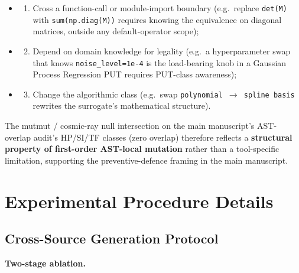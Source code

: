 \documentclass[manuscript,screen,review]{acmart}
\begin{document}
\begin{itemize}

\item
  \begin{enumerate}
  
  \item
    Cross a function-call or module-import boundary (e.g.~replace
    \texttt{det(M)} with \texttt{sum(np.diag(M))} requires knowing the
    equivalence on diagonal matrices, outside any default-operator
    scope);
  \end{enumerate}
\item
  \begin{enumerate}
  \setcounter{enumi}{1}
  
  \item
    Depend on domain knowledge for legality (e.g.~a hyperparameter swap
    that knows \texttt{noise\_level=1e-4} is the load-bearing knob in a
    Gaussian Process Regression PUT requires PUT-class awareness);
  \end{enumerate}
\item
  \begin{enumerate}
  \setcounter{enumi}{2}
  
  \item
    Change the algorithmic class (e.g.~swap
    \texttt{polynomial\ $\to$\ spline\ basis} rewrites the surrogate's
    mathematical structure).
  \end{enumerate}
\end{itemize}

The mutmut / cosmic-ray null intersection on the main manuscript's AST-overlap audit's HP/SI/TF classes
(zero overlap) therefore reflects a \textbf{structural property of
first-order AST-local mutation} rather than a tool-specific limitation,
supporting the preventive-defence framing in the main manuscript.


\section{Experimental Procedure Details}\label{c.-experimental-procedure-details}

\subsection{Cross-Source Generation Protocol}\label{c.1-cross-source-v4-protocol-full-specification}

\textbf{Two-stage ablation.}
\end{document}
